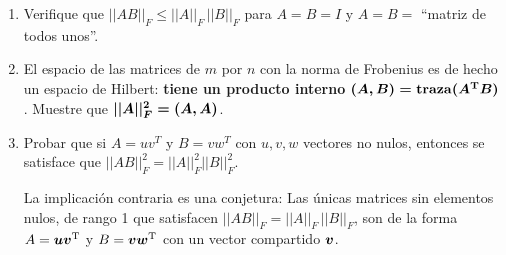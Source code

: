 \documentclass[12pt,a4paper]{article}
\newcommand{\bi}[1]{\hbox{\boldmath$#1$}}
\newcommand\1{\mbox{\,\vrule height-0.8pt depth1.0pt width2pc\,}}
\newcommand\2{\mbox{\,\vrule height-0.8pt depth1.0pt width1pc\,}}
\DeclareRobustCommand\transp{^{\mathrm{T}}}
\newcommand{\bu}{\hbox{\boldmath$u$}}
\newcommand{\bv}{\hbox{\boldmath$v$}}
\newcommand{\bw}{\hbox{\boldmath$w$}}
\begin{document}
\begin{enumerate}
\vspace{5pt}
\hspace{10pt}
Sume ambos lados para todo $i$ y $j$ para mostrar que $||AB||^2_F\leq||A||^2_F\,||B||^2_F$.

\item Verifique que $||AB||_F\leq||A||_F\,||B||_F$ para $A=B=I$ y $A=B=$ ``matriz de todos unos''.

\item El espacio de las matrices de $m$ por $n$ con la norma de Frobenius es de hecho un  espacio de Hilbert: %
\textbf{tiene un producto interno} $\bi{(A,B )=\hbox{\textbf{traza}}(A\transp B)}$. Muestre que $\bi{||A||^2_F=(A,A)}$.\linebreak\vspace{-11pt}

\item Probar que si $A = u v^T$ y $B= v w^T$ con $u,v,w$ vectores no nulos, entonces se satisface que $||AB||_F^2=||A||_F^2||B||_F^2$.

La implicación contraria es una conjetura: Las únicas matrices sin elementos nulos, de rango 1 que satisfacen $||AB||_F=||A||_F\,||B||_F$, son de la forma $A=\bu\bv\transp$ y $B=\bv\bw\transp$ con un vector compartido $\bv$.


\end{enumerate}
\end{document}
